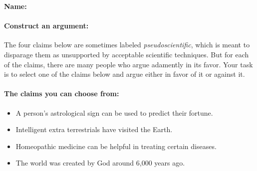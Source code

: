 \documentclass[10pt]{article}
\begin{document}
\textbf{Name:}\underline{\hspace{2in}}

\paragraph{Construct an argument:} The four claims below are sometimes labeled \textit{pseudoscientific}, which is meant to disparage them as unsupported by acceptable scientific techniques.  But for each of the claims, there are many people who argue adamently in its favor. Your task is to select one of the claims below and argue either in favor of it or against it.

\paragraph{The claims you can choose from:}
\begin{itemize}
 \item A person's astrological sign can be used to predict their fortune.
 \item Intelligent extra terrestrials have visited the Earth.
 \item Homeopathic medicine can be helpful in treating certain diseases.
 \item The world was created by God around 6,000 years ago.
\end{itemize}
\end{document}
